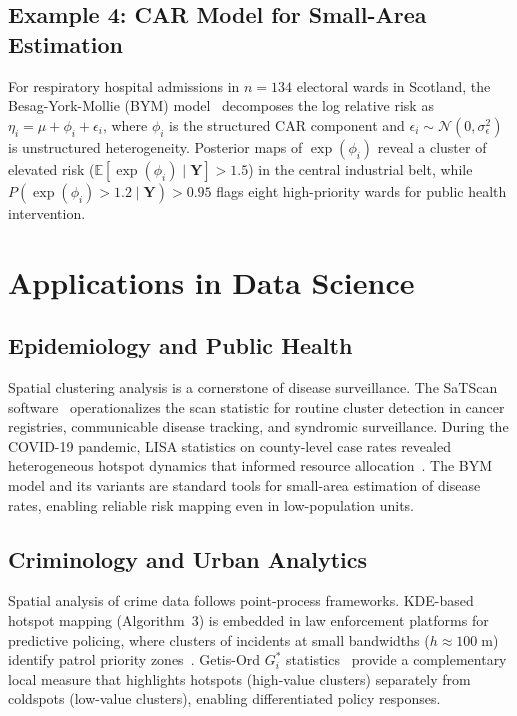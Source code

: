 \documentclass[conference]{IEEEtran}
\theoremstyle{definition}
\begin{document}
\subsection{Example 4: CAR Model for Small-Area Estimation}

For respiratory hospital admissions in $n = 134$ electoral wards in Scotland, the Besag-York-Mollie (BYM) model~\cite{besag1991} decomposes the log relative risk as $\eta_i = \mu + \phi_i + \epsilon_i$, where $\phi_i$ is the structured CAR component and $\epsilon_i \sim \mathcal{N}(0, \sigma_\epsilon^2)$ is unstructured heterogeneity. Posterior maps of $\exp(\phi_i)$ reveal a cluster of elevated risk ($\mathbb{E}[\exp(\phi_i)\mid\mathbf{Y}] > 1.5$) in the central industrial belt, while $P(\exp(\phi_i) > 1.2 \mid \mathbf{Y}) > 0.95$ flags eight high-priority wards for public health intervention.

\section{Applications in Data Science}
\label{sec:applications}

\subsection{Epidemiology and Public Health}

Spatial clustering analysis is a cornerstone of disease surveillance. The SaTScan software~\cite{kulldorff1997} operationalizes the scan statistic for routine cluster detection in cancer registries, communicable disease tracking, and syndromic surveillance. During the COVID-19 pandemic, LISA statistics on county-level case rates revealed heterogeneous hotspot dynamics that informed resource allocation~\cite{desjardins2020}. The BYM model and its variants are standard tools for small-area estimation of disease rates, enabling reliable risk mapping even in low-population units.

\subsection{Criminology and Urban Analytics}

Spatial analysis of crime data follows point-process frameworks. KDE-based hotspot mapping (Algorithm~3) is embedded in law enforcement platforms for predictive policing, where clusters of incidents at small bandwidths ($h \approx 100\;\text{m}$) identify patrol priority zones~\cite{chainey2008}. Getis-Ord $G_i^*$ statistics~\cite{getis1992} provide a complementary local measure that highlights hotspots (high-value clusters) separately from coldspots (low-value clusters), enabling differentiated policy responses.
\end{document}
